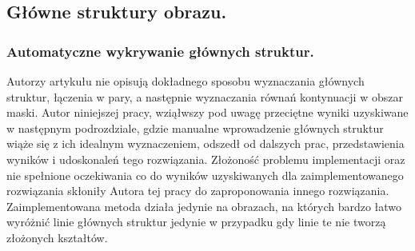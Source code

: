 \documentclass[12pt, twoside, openany]{report}
\theoremstyle{definition}
\begin{document}
\subsection{Główne struktury obrazu.}
\subsubsection{Automatyczne wykrywanie głównych struktur.}
Autorzy artykułu \cite{SalientStrucTexProp} nie opisują dokładnego sposobu wyznaczania głównych struktur, łączenia w pary, a następnie wyznaczania równań kontynuacji w obszar maski. Autor niniejszej pracy, wziąłwszy pod uwagę przeciętne wyniki uzyskiwane w następnym podrozdziale, gdzie manualne wprowadzenie głównych struktur wiąże się z ich idealnym wyznaczeniem, odszedł od dalszych prac, przedstawienia wyników i udoskonaleń tego rozwiązania.
Złożoność problemu implementacji oraz nie spełnione oczekiwania co do wyników uzyskiwanych dla zaimplementowanego rozwiązania skłoniły Autora tej pracy do zaproponowania innego rozwiązania. Zaimplementowana metoda działa jedynie na obrazach, na których bardzo łatwo wyróżnić linie głównych struktur jedynie w przypadku gdy linie te nie tworzą złożonych kształtów.
\end{document}
